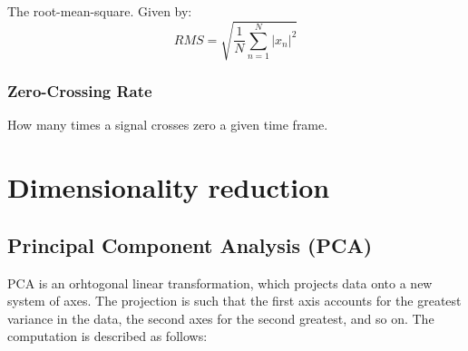 \documentclass[a4paper, 12pt, twoside]{report}
\begin{document}
    The root-mean-square. Given by:
    \[ RMS = \sqrt{\frac{1}{N}\sum^{N}_{n=1}|x_{n}|^{2}}\]

\subsubsection{Zero-Crossing Rate }
\label{sec:org7b27629}

    How many times a signal crosses zero a given time frame.
\section{Dimensionality reduction}
\label{sec:orgb502774}
\subsection{Principal Component Analysis (PCA)}
\label{sec:org93f3c9b}

PCA is an orhtogonal linear transformation, which projects data onto a new system of axes. The projection is such that the first axis accounts for the greatest variance in the data, the second axes for the second greatest, and so on. The computation is described as follows:
\end{document}
